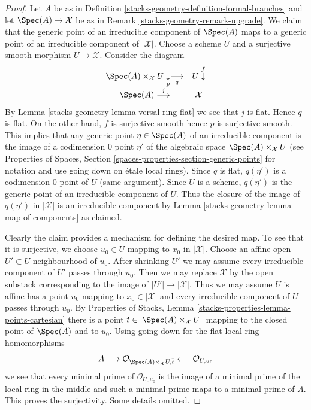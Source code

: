 \begin{proof}
Let $A$ be as in Definition \ref{stacks-geometry-definition-formal-branches} and
let $\Spec(A) \to \mathcal{X}$ be as in Remark \ref{stacks-geometry-remark-upgrade}.
We claim that the generic point of an irreducible component of
$\Spec(A)$ maps to a generic point of an irreducible component
of $|\mathcal{X}|$. Choose a scheme $U$ and a surjective
smooth morphism $U \to \mathcal{X}$. Consider the diagram
$$
\begin{array}{cc}\Spec(A) \times_\mathcal{X} U \underset{p}{\downarrow}\underset{q}{\longrightarrow} & U \overset{f}{\downarrow} \\ \Spec(A) \overset{j}{\longrightarrow} & \mathcal{X}\end{array}
$$
By Lemma \ref{stacks-geometry-lemma-versal-ring-flat} we see that $j$ is flat.
Hence $q$ is flat. On the other hand, $f$ is surjective smooth
hence $p$ is surjective smooth. This implies that any generic point
$\eta \in \Spec(A)$ of an irreducible component is the image of a
codimension $0$ point $\eta'$ of the algebraic space
$\Spec(A) \times_\mathcal{X} U$ (see
Properties of Spaces, Section \ref{spaces-properties-section-generic-points}
for notation and use going down on \'etale local rings).
Since $q$ is flat, $q(\eta')$ is a codimension $0$ point of $U$
(same argument).
Since $U$ is a scheme, $q(\eta')$ is the generic point
of an irreducible component of $U$. Thus the closure of the image
of $q(\eta')$ in $|\mathcal{X}|$ is an irreducible component
by Lemma \ref{stacks-geometry-lemma-map-of-components} as claimed.

\medskip\noindent
Clearly the claim provides a mechanism for defining the desired map.
To see that it is surjective, we choose $u_0 \in U$ mapping to
$x_0$ in $|\mathcal{X}|$. Choose an affine open $U' \subset U$
neighbourhood of $u_0$. After shrinking $U'$ we may assume every
irreducible component of $U'$ passes through $u_0$. Then we may
replace $\mathcal{X}$ by the open substack corresponding to the
image of $|U'| \to |\mathcal{X}|$. Thus we may assume $U$ is affine
has a point $u_0$ mapping to $x_0 \in |\mathcal{X}|$
and every irreducible component of $U$ passes through $u_0$.
By Properties of Stacks, Lemma
\ref{stacks-properties-lemma-points-cartesian}
there is a point $t \in |\Spec(A) \times_\mathcal{X} U|$
mapping to the closed point of $\Spec(A)$ and to $u_0$.
Using going down for the flat local ring homomorphisms
$$
A \longrightarrow
\mathcal{O}_{\Spec(A) \times_\mathcal{X} U, \overline{t}}
\longleftarrow \mathcal{O}_{U, u_0}
$$
we see that every minimal prime of $\mathcal{O}_{U, u_0}$
is the image of a minimal prime of the local ring in the middle
and such a minimal prime maps to a minimal prime of $A$.
This proves the surjectivity. Some details omitted.
\end{proof}

